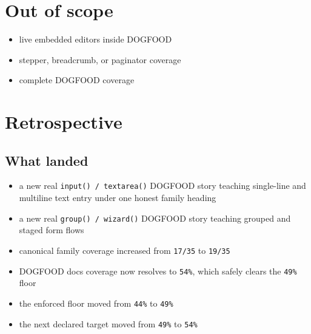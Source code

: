 \section{Out of scope}\label{record-073-out-of-scope}

\begin{itemize}
\tightlist
\item
  live embedded editors inside DOGFOOD
\item
  stepper, breadcrumb, or paginator coverage
\item
  complete DOGFOOD coverage
\end{itemize}

\section{Retrospective}\label{record-073-retrospective}

\subsection{What landed}\label{record-073-what-landed}

\begin{itemize}
\tightlist
\item
  a new real \texttt{i\allowbreak{}n\allowbreak{}p\allowbreak{}u\allowbreak{}t\allowbreak{}(\allowbreak{})\allowbreak{} \allowbreak{}/\allowbreak{} \allowbreak{}t\allowbreak{}e\allowbreak{}x\allowbreak{}t\allowbreak{}a\allowbreak{}r\allowbreak{}e\allowbreak{}a\allowbreak{}(\allowbreak{})} DOGFOOD story teaching single-line and multiline text entry under one honest family heading
\item
  a new real \texttt{g\allowbreak{}r\allowbreak{}o\allowbreak{}u\allowbreak{}p\allowbreak{}(\allowbreak{})\allowbreak{} \allowbreak{}/\allowbreak{} \allowbreak{}w\allowbreak{}i\allowbreak{}z\allowbreak{}a\allowbreak{}r\allowbreak{}d\allowbreak{}(\allowbreak{})} DOGFOOD story teaching grouped and staged form flows
\item
  canonical family coverage increased from \texttt{1\allowbreak{}7\allowbreak{}/\allowbreak{}3\allowbreak{}5} to \texttt{1\allowbreak{}9\allowbreak{}/\allowbreak{}3\allowbreak{}5}
\item
  DOGFOOD docs coverage now resolves to \texttt{5\allowbreak{}4\allowbreak{}\%}, which safely clears the \texttt{4\allowbreak{}9\allowbreak{}\%} floor
\item
  the enforced floor moved from \texttt{4\allowbreak{}4\allowbreak{}\%} to \texttt{4\allowbreak{}9\allowbreak{}\%}
\item
  the next declared target moved from \texttt{4\allowbreak{}9\allowbreak{}\%} to \texttt{5\allowbreak{}4\allowbreak{}\%}
\end{itemize}

